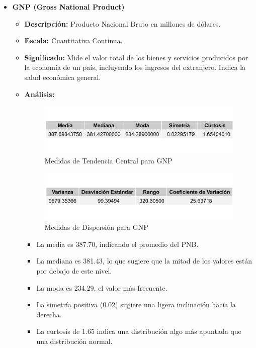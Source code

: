 \documentclass{article}
\begin{document}
\begin{itemize}
    \item \textbf{GNP (Gross National Product)}
    \begin{itemize}
        \item \textbf{Descripción:} Producto Nacional Bruto en millones de dólares.
        \item \textbf{Escala:} Cuantitativa Continua.
        \item \textbf{Significado:} Mide el valor total de los bienes y servicios producidos por la economía de un país, incluyendo los ingresos del extranjero. Indica la salud económica general.
        \item \textbf{Análisis:} 
        \begin{figure}[H]
            \centering
            \includegraphics[width=\textwidth]{MTC/GNP_central.png}
            \caption{Medidas de Tendencia Central para GNP}
        \end{figure}
        \begin{figure}[H]
            \centering
            \includegraphics[width=\textwidth]{MTC/GNP_dispersion.png}
            \caption{Medidas de Dispersión para GNP}
        \end{figure}
            \begin{itemize}
                \item La media es 387.70, indicando el promedio del PNB.
                \item La mediana es 381.43, lo que sugiere que la mitad de los valores están por debajo de este nivel.
                \item La moda es 234.29, el valor más frecuente.
                \item La simetría positiva (0.02) sugiere una ligera inclinación hacia la derecha.
                \item La curtosis de 1.65 indica una distribución algo más apuntada que una distribución normal.

\end{itemize}
\end{itemize}
\end{itemize}
\end{document}
